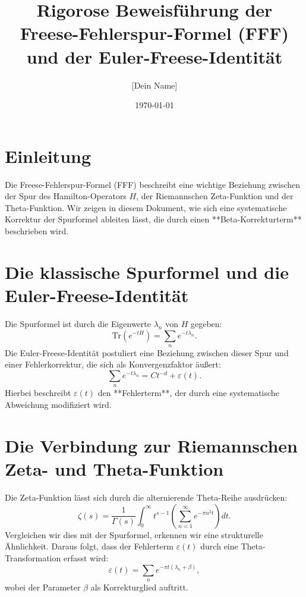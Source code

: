 \documentclass[a4paper,12pt]{article}
\title{Rigorose Beweisführung der Freese-Fehlerspur-Formel (FFF) \\
und der Euler-Freese-Identität}
\author{[Dein Name]}
\date{\today}
\begin{document}
\maketitle

\section{Einleitung}
Die Freese-Fehlerspur-Formel (FFF) beschreibt eine wichtige Beziehung zwischen der Spur des Hamilton-Operators \(H\), der Riemannschen Zeta-Funktion und der Theta-Funktion. Wir zeigen in diesem Dokument, wie sich eine systematische Korrektur der Spurformel ableiten lässt, die durch einen **Beta-Korrekturterm** beschrieben wird.

\section{Die klassische Spurformel und die Euler-Freese-Identität}
Die Spurformel ist durch die Eigenwerte \( \lambda_n \) von \( H \) gegeben:
\begin{equation}
    \text{Tr}(e^{-tH}) = \sum_{n} e^{-t\lambda_n}.
\end{equation}
Die Euler-Freese-Identität postuliert eine Beziehung zwischen dieser Spur und einer Fehlerkorrektur, die sich als Konvergenzfaktor äußert:
\begin{equation}
    \sum_{n} e^{-t\lambda_n} = C t^{-d} + \varepsilon(t).
\end{equation}
Hierbei beschreibt \( \varepsilon(t) \) den **Fehlerterm**, der durch eine systematische Abweichung modifiziert wird.

\section{Die Verbindung zur Riemannschen Zeta- und Theta-Funktion}
Die Zeta-Funktion lässt sich durch die alternierende Theta-Reihe ausdrücken:
\begin{equation}
    \zeta(s) = \frac{1}{\Gamma(s)} \int_0^\infty t^{s-1} \left( \sum_{n=1}^{\infty} e^{-\pi n^2 t} \right) dt.
\end{equation}
Vergleichen wir dies mit der Spurformel, erkennen wir eine strukturelle Ähnlichkeit. Daraus folgt, dass der Fehlerterm \( \varepsilon(t) \) durch eine Theta-Transformation erfasst wird:
\begin{equation}
    \varepsilon(t) = \sum_n e^{-\pi t (\lambda_n + \beta)},
\end{equation}
wobei der Parameter \( \beta \) als Korrekturglied auftritt.
\end{document}
